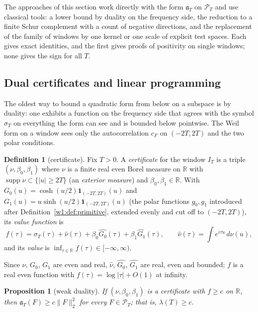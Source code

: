 \documentclass[11pt]{amsart}
\newtheorem{proposition}[theorem]{Proposition}
\theoremstyle{definition}
\newtheorem{definition}[theorem]{Definition}
\theoremstyle{remark}
\numberwithin{equation}{section}
\newcommand{\R}{\mathbb{R}}
\DeclareMathOperator{\supp}{supp}
\newcommand{\IT}{I_T}                                  %
\newcommand{\cF}{c_F}                                  %
\newcommand{\PT}{\mathcal{P}_T}                        %
\newcommand{\aT}{\mathfrak{a}_T}                       %
\newcommand{\sT}{\sigma_T}                             %
\newcommand{\lam}{\lambda(T)}                          %
\begin{document}
The approaches of this section work directly with the form $\aT$ on $\PT$ and use classical tools: a lower bound by
duality on the frequency side, the reduction to a finite Schur complement with a count of negative directions, and
the replacement of the family of windows by one kernel or one scale of explicit test spaces. Each gives exact identities,
and the first gives proofs of positivity on single windows; none gives the sign for all $T$.

\subsection{Dual certificates and linear programming}\label{w5:fam:R7}

The oldest way to bound a quadratic form from below on a subspace is by duality: one exhibits a function on the
frequency side that agrees with the symbol $\sT$ on everything the form can see and is bounded below pointwise. The Weil
form on a window sees only the autocorrelation $\cF$ on $(-2T,2T)$ and the two polar conditions.

\begin{definition}[certificate]\label{w5:def:cert}
Fix $T>0$. A \emph{certificate} for the window $\IT$ is a triple $(\nu,\beta_0,\beta_1)$ where $\nu$ is a finite real even
Borel measure on $\R$ with $\supp\nu\subset\{|u|\ge2T\}$ (an \emph{exterior measure}) and $\beta_0,\beta_1\in\R$. With
$G_0(u)=\cosh(u/2)\mathbf 1_{(-2T,2T)}(u)$ and $G_1(u)=u\sinh(u/2)\mathbf 1_{(-2T,2T)}(u)$ (the polar functions $g_0,g_1$ introduced after
Definition~\ref{w1:def:primitive}, extended evenly and cut off to $(-2T,2T)$), its \emph{value function} is
\begin{equation}\label{w5:eq:valuefn}
  f(\tau)=\sT(\tau)+\widehat\nu(\tau)+\beta_0\widehat{G_0}(\tau)+\beta_1\widehat{G_1}(\tau),\qquad
  \widehat\nu(\tau)=\int e^{i\tau u}\,d\nu(u),
\end{equation}
and its \emph{value} is $\inf_{\tau\in\R}f(\tau)\in[-\infty,\infty)$.
\end{definition}

Since $\nu$, $G_0$, $G_1$ are even and real, $\widehat\nu$, $\widehat{G_0}$, $\widehat{G_1}$ are real, even and bounded;
$f$ is a real even function with $f(\tau)=\log|\tau|+O(1)$ at infinity.

\begin{proposition}[weak duality]\label{w5:prop:weakdual}
If $(\nu,\beta_0,\beta_1)$ is a certificate with $f\ge c$ on $\R$, then $\aT(F)\ge c\|F\|_2^2$ for every $F\in\PT$; that is,
$\lam\ge c$.
\end{proposition}
\end{document}
